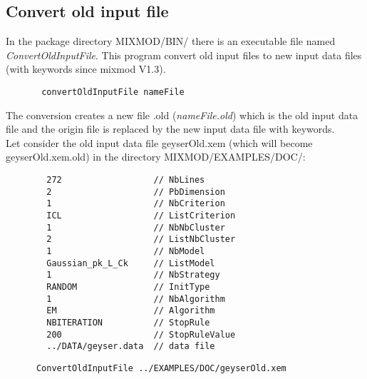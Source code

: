 \subsection{ Convert old input file}
In the package directory MIXMOD/BIN/ there is an executable file named {\em ConvertOldInputFile}.
 This program convert old input files to new input data files (with keywords since {\sc mixmod} V1.3).\\
{\scriptsize
\begin{verbatim}
       convertOldInputFile nameFile
\end{verbatim}}

{\noindent The conversion creates a new file .old ({\em nameFile.old}) which is the old input data file and the
origin file is replaced by the new input data file with keywords.}\\
Let consider the old input data file geyserOld.xem (which will become geyserOld.xem.old) in the
directory MIXMOD/EXAMPLES/DOC/:
{\scriptsize
\begin{verbatim}
        272                  // NbLines
        2                    // PbDimension
        1                    // NbCriterion
        ICL                  // ListCriterion
        1                    // NbNbCluster
        2                    // ListNbCluster
        1                    // NbModel
        Gaussian_pk_L_Ck     // ListModel
        1                    // NbStrategy
        RANDOM               // InitType
        1                    // NbAlgorithm
        EM                   // Algorithm
        NBITERATION          // StopRule
        200                  // StopRuleValue
        ../DATA/geyser.data  // data file

\end{verbatim}}

{\scriptsize
\begin{verbatim}
      ConvertOldInputFile ../EXAMPLES/DOC/geyserOld.xem

\end{verbatim}}

